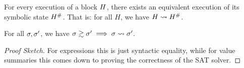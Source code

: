 {%


\begin{lemma}\label{thm:soundness}
  For every execution of a block $H$, there exists an equivalent
  execution of its symbolic state $H^{\#}$. That is: for all $H$, we have $H \mathrel{\leadsto} H^{\#}$.

\end{lemma}

\begin{lemma}\label{thm:correctness} For all $\sigma, \sigma'$, we have $\sigma \gtrsim
    \sigma' \implies \sigma \mathrel{\leadsto} \sigma'$.

  \begin{proof}[Proof Sketch] For
    expressions this is just syntactic equality, while for value summaries
    this comes down to proving the correctness of the SAT solver.
  \end{proof}
\end{lemma}

}
